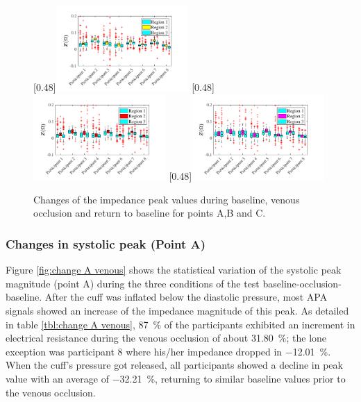 \begin{figure}[!htbp]
	\null\hfill%
	[0.48\textwidth]{\includegraphics[width=0.45\textwidth, trim={0.5cm 0cm 1.5cm 0 cm}, clip]{figure_apa_3a}}%
	\hfill%
	[0.48\textwidth]{\includegraphics[width=0.45\textwidth, trim={0.5cm 0cm 1.5cm 0 cm}, clip]{figure_apa_3b}}%
	\hfill%
	[0.48\textwidth]{\includegraphics[width=0.45\textwidth, trim={0.5cm 0cm 1.5cm 0 cm}, clip]{figure_apa_3c}}%
	\null%
	\caption{Changes of the impedance peak values during baseline, venous occlusion and return to baseline for points A,B and C.}
	\label{fig:iPG change points venous}
\end{figure}


\subsubsection{Changes in systolic peak (Point A)}
\label{section apa 2.1.1}
Figure \ref{fig:change A venous} shows the statistical variation of the systolic peak magnitude (point A) during the three conditions of the test baseline-occlusion-baseline. After the cuff was inflated below the diastolic pressure, most APA signals showed an increase of the impedance magnitude of this peak. As detailed in table \ref{tbl:change A venous}, \SI{87}{\percent} of the participants exhibited an increment in electrical resistance during the venous occlusion of about \SI{31.80}{\percent}; the lone exception was participant 8 where his/her impedance dropped in \SI{-12.01}{\percent}. When the cuff's pressure got released, all participants showed a decline in peak value with an average of \SI{-32.21}{\percent}, returning to similar baseline values prior to the venous occlusion.

